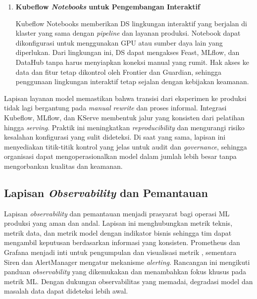 \begin{enumerate}
    KServe menyediakan \textit{inference service} yang berjalan secara \textit{serverless} di atas Kubernetes, dengan dukungan \textit{auto-scaling} dan \textit{canary deployment} \autocite{kserve2024,shankar2022operationalizing}. Konfigurasi \texttt{InferenceService} mendeskripsikan bagaimana model di-\textit{deploy}, termasuk versi kontainer, sumber model, dan pengaturan skala. Kemampuan menjalankan beberapa versi model secara bersamaan memungkinkan \textit{A/B testing} dan \textit{canary rollout} yang aman. Log permintaan dan respons dapat dikirim ke Kafka dan kemudian disalurkan ke ClickHouse melalui Firehose untuk analitik pascadeploy.

    \vspace{0.5em}

    \item \textbf{Kubeflow \textit{Notebooks} untuk Pengembangan Interaktif}  

    Kubeflow Notebooks memberikan DS lingkungan interaktif yang berjalan di klaster yang sama dengan \textit{pipeline} dan layanan produksi. Notebook dapat dikonfigurasi untuk menggunakan GPU atau sumber daya lain yang diperlukan. Dari lingkungan ini, DS dapat mengakses Feast, MLflow, dan DataHub tanpa harus menyiapkan koneksi manual yang rumit. Hak akses ke data dan fitur tetap dikontrol oleh Frontier dan Guardian, sehingga penggunaan lingkungan interaktif tetap sejalan dengan kebijakan keamanan.

    \vspace{0.5em}
\end{enumerate}

Lapisan layanan model memastikan bahwa transisi dari eksperimen ke produksi tidak lagi bergantung pada \textit{manual rewrite} dan proses informal. Integrasi Kubeflow, MLflow, dan KServe membentuk jalur yang konsisten dari pelatihan hingga \textit{serving}. Praktik ini meningkatkan \textit{reproducibility} dan mengurangi risiko kesalahan konfigurasi yang sulit dideteksi. Di saat yang sama, lapisan ini menyediakan titik-titik kontrol yang jelas untuk audit dan \textit{governance}, sehingga organisasi dapat mengoperasionalkan model dalam jumlah lebih besar tanpa mengorbankan kualitas dan keamanan.

\subsection{Lapisan \textit{Observability} dan Pemantauan}

Lapisan \textit{observability} dan pemantauan menjadi prasyarat bagi operasi ML produksi yang aman dan andal. Lapisan ini menghubungkan metrik teknis, metrik data, dan metrik model dengan indikator bisnis sehingga tim dapat mengambil keputusan berdasarkan informasi yang konsisten. Prometheus dan Grafana menjadi inti untuk pengumpulan dan visualisasi metrik \autocite{prometheus2024,grafana2024}, sementara Siren dan AlertManager mengatur mekanisme \textit{alerting}. Rancangan ini mengikuti panduan \textit{observability} yang dikemukakan \textcite{cncf2024observability,ibm2024observability} dan menambahkan fokus khusus pada metrik ML. Dengan dukungan observabilitas yang memadai, degradasi model dan masalah data dapat dideteksi lebih awal.

